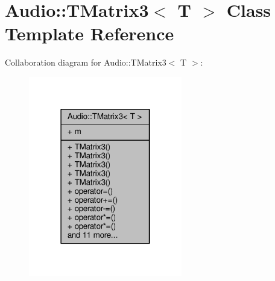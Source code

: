 \hypertarget{classAudio_1_1TMatrix3}{}\section{Audio\+:\+:T\+Matrix3$<$ T $>$ Class Template Reference}
\label{classAudio_1_1TMatrix3}


Collaboration diagram for Audio\+:\+:T\+Matrix3$<$ T $>$\+:
\nopagebreak
\begin{figure}[H]
\begin{center}
\leavevmode
\includegraphics[width=190pt]{d5/d87/classAudio_1_1TMatrix3__coll__graph}
\end{center}
\end{figure}
